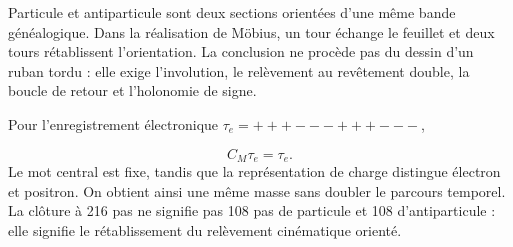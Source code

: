 Particule et antiparticule sont deux sections orientées d'une même bande généalogique. Dans la réalisation de Möbius, un tour échange le feuillet et deux tours rétablissent l'orientation. La conclusion ne procède pas du dessin d'un ruban tordu : elle exige l'involution, le relèvement au revêtement double, la boucle de retour et l'holonomie de signe.

Pour l'enregistrement électronique \(\tau_e=+++---+++---\),

\[
C_M\tau_e=\tau_e.
\]
Le mot central est fixe, tandis que la représentation de charge distingue électron et positron. On obtient ainsi une même masse sans doubler le parcours temporel. La clôture à 216 pas ne signifie pas 108 pas de particule et 108 d'antiparticule : elle signifie le rétablissement du relèvement cinématique orienté.


